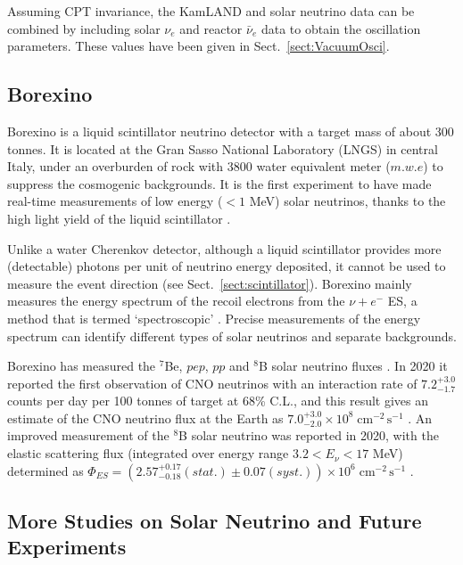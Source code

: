 Assuming CPT invariance, the KamLAND and solar neutrino data can be combined by including solar $\nu_e$ and reactor $\bar{\nu}_e$ data to obtain the oscillation parameters. These values have been given in Sect.~\ref{sect:VacuumOsci}.

\subsection{Borexino}

Borexino is a liquid scintillator neutrino detector with a target mass of about 300 tonnes. It is located at the Gran Sasso National Laboratory (LNGS) in central Italy, under an overburden of rock with 3800 water equivalent meter ($m.w.e$) to suppress the cosmogenic backgrounds. It is the first experiment to have made real-time measurements of low energy ($<1$ MeV) solar neutrinos, thanks to the high light yield of the liquid scintillator \cite{agostini2020improved}.

Unlike a water Cherenkov detector, although a liquid scintillator provides more (detectable) photons per unit of neutrino energy deposited, it cannot be used to measure the event direction (see Sect.~\ref{sect:scintillator}). Borexino mainly measures the energy spectrum of the recoil electrons from the $\nu+e^-$ ES, a method that is termed `spectroscopic' \cite{agostini2020improved}. Precise measurements of the energy spectrum can identify different types of solar neutrinos and separate backgrounds.

Borexino has measured the $^7$Be, $pep$, $pp$ and $^8$B solar neutrino fluxes \cite{agostini2018comprehensive}. In 2020 it reported the first observation of CNO neutrinos with an interaction rate of $7.2^{+3.0}_{-1.7}$ counts per day per 100 tonnes of target at 68\% C.L., and this result gives an estimate of the CNO neutrino flux at the Earth as $7.0^{+3.0}_{-2.0}\times 10^8 \; \mathrm{cm^{-2} \, s^{-1}}$ \cite{borexino2020experimental}. An improved measurement of the $^8$B solar neutrino was reported in 2020, with the elastic scattering flux (integrated over energy range $3.2<E_\nu <17$ MeV) determined as $\Phi_{ES}=(2.57^{+0.17}_{-0.18}(stat.)\pm 0.07 (syst.))\times 10^6 \; \mathrm{cm^{-2} \, s^{-1}}$ \cite{agostini2020improved}.

\subsection{More Studies on Solar Neutrino and Future Experiments}\label{sect:futureSolar}

